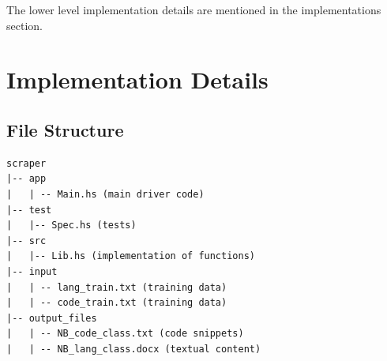 \documentclass[12pt]{scrreprt}
\newcommand{\ttt}[1]{\texttt{#1}}
\begin{document}
\begin{enumerate}
\begin{enumerate}
    \end{enumerate}

\end{enumerate}

The lower level implementation details are mentioned in the implementations section. 









\chapter{Implementation Details}


\section{File Structure}


\begin{verbatim}
scraper
|-- app
|   | -- Main.hs (main driver code)
|-- test
|   |-- Spec.hs (tests)
|-- src
|   |-- Lib.hs (implementation of functions)
|-- input
|   | -- lang_train.txt (training data)
|   | -- code_train.txt (training data)
|-- output_files
|   | -- NB_code_class.txt (code snippets)
|   | -- NB_lang_class.docx (textual content)

\end{verbatim}
\end{document}
